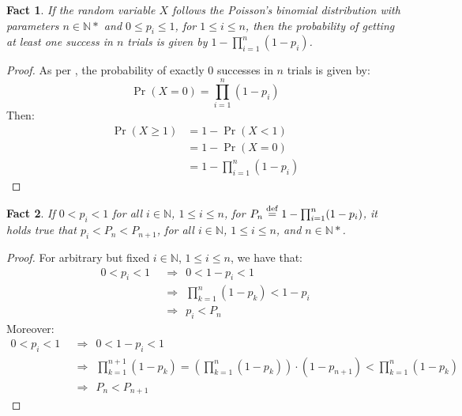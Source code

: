 \documentclass[a4paper,9pt,leqno]{article}
\renewcommand{\=}{\protect\nobreakdash-\hspace{0pt}}
\renewcommand{\~}{\protect\nobreakdash--\hspace{0pt}}
\theoremstyle{plain}
\newtheorem{fact}{Fact}
\theoremstyle{definition}
\theoremstyle{remark}
\newcommand{\impll}{\:\:\Longrightarrow\:\:}
\newcommand{\impl}{\impll}%
\newcommand{\by}[1]{{#1}}
\newcommand{\bydef}{\by{def}}
\newcommand{\eq}{=}
\newcommand{\eqby}[1]{\symbyrm{#1}{=}}
\newcommand{\eqbydef}{\eqby{\bydef}}
\newcommand{\symby}[2]{\stackrel{#1}{{#2}}}
\newcommand{\symbyrm}[2]{\symby{{\rm\scriptstyle{#1}}}{#2}}
\newcommand{\lt}{<}
\newcommand{\lp}{\left(}
\newcommand{\rp}{\right)}
\newcommand\Nat{\mathbb{N}}
\newcommand\Nat*{\mathbb{N}^*}
\begin{document}
\begin{fact}
If the random variable $X$ follows the Poisson's binomial distribution
with parameters $n \in \Nat*$ and $0 \le p_i \le 1$, for $1 \le i \le n$,
then the probability of getting \emph{at least one success} in $n$ trials
is given by $1 - \prod_{i=1}^n (1 - p_i)$.
\end{fact}

\begin{proof}
As per \cite{wiki:poissonbinomialdist}, the probability of exactly
$0$ successes in $n$ trials is given by:
%
\begin{equation*}
\Pr(X \eq 0) = \prod_{i=1}^n (1 - p_i) 
\end{equation*}
%
Then:
%
\begin{align*}
\Pr(X \ge 1) & = 1 - \Pr(X \lt 1) \\
             & = 1 - \Pr(X \eq 0) \\
             & = 1 - \prod_{i=1}^n (1 - p_i)
\end{align*}
%
\end{proof}

\begin{fact}
If $0 \lt p_i \lt 1$ for all $i \in \Nat$, $1 \le i \le n$,
for $P_n \eqbydef 1 - \prod_{i=1}^n(1 - p_i)$, it holds true that
$p_i \lt P_n \lt P_{n+1}$, for all $i \in \Nat$, $1 \le i \le n$,
and $n \in \Nat*$.
\end{fact}

\begin{proof}
%
For arbitrary but fixed $i \in \Nat$, $1 \le i \le n$, we have that:
%
\begin{align*}
0 \lt p_i \lt 1 & \impl 0 \lt 1 - p_i \lt 1 \\
                & \impl \prod_{k=1}^n (1 - p_k) \lt 1 - p_i \\
                & \impl p_i \lt P_n
\end{align*}
%
Moreover:
%
\begin{align*}
0 \lt p_i \lt 1 & \impl 0 \lt 1 - p_i \lt 1 \\
                & \impl \prod_{k=1}^{n+1} (1 - p_k)
                       \eq \lp \prod_{k=1}^n (1 - p_k) \rp \cdot (1 - p_{n+1}) 
                       \lt \prod_{k=1}^n (1 - p_k) \\
                & \impl P_n \lt P_{n+1}
\end{align*}
%
\end{proof}
\end{document}
